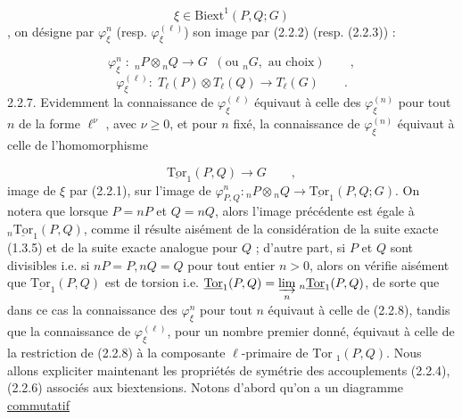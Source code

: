 \begin{equation}\tag{2.2.4}
\xi \in \mathrm{Biext}^1(P,Q;G)
\end{equation}
,
on désigne par $\varphi_\xi^n$ (resp. $\varphi_\xi^{(\ell)}$) son image par (2.2.2) (resp. (2.2.3)) :

\begin{equation}\tag{2.2.5}
\varphi_\xi^n \; : \; {}_nP \otimes {}_nQ \longrightarrow G \;\; (\text{ou } {}_nG, \text{ au choix}) \qquad ,
\end{equation}
\begin{equation}\tag{2.2.6}
\varphi_\xi^{(\ell)} : \; T_\ell(P) \otimes T_\ell(Q) \longrightarrow T_\ell(G) \qquad .
\end{equation}
2.2.7.  Evidemment la connaissance de $\varphi_\xi^{(\ell)}$ équivaut à celle des $\varphi_\xi^{(n)}$ pour tout $n$ de la forme $\ell^\nu$ , avec $\nu \geq 0$, et pour $n$ fixé, la connaissance de $\varphi_\xi^{(n)}$ équivaut à celle de l'homomorphisme

\begin{equation}\tag{2.2.8}
\underline{\mathrm{Tor}}_1(P,Q) \longrightarrow G \qquad ,
\end{equation}
image de $\xi$ par (2.2.1), sur l'image de $\varphi^n_{P,Q} : {}_nP \otimes {}_nQ \longrightarrow \underline{\mathrm{Tor}}_1(P,Q;G)$. On notera que lorsque $P=nP$ et $Q=nQ$, alors l'image précédente est égale à ${}_n\underline{\mathrm{Tor}}_1(P,Q)$, comme il résulte aisément de la considération de la suite exacte (1.3.5) et de la suite exacte analogue pour $Q$ ; d'autre part, si $P$ et $Q$ sont divisibles i.e. si $nP=P,nQ=Q$ pour tout entier $n > 0$, alors on vérifie aisément que $\underline{\mathrm{Tor}}_1(P,Q)$ est de torsion i.e. $\underline{\mathrm{Tor}}_1(P,Q) = \underset{n}{\varinjlim}\; {}_n\underline{\mathrm{Tor}}_1(P,Q)$, de sorte que dans ce cas la connaissance des $\varphi_\xi^n$ pour tout $n$ équivaut à celle de (2.2.8), tandis que la connaissance de $\varphi_\xi^{(\ell)}$, pour un nombre premier donné, équivaut à celle de la restriction de (2.2.8) à la composante $\ell$-primaire de $\mathrm{Tor}\; {}_1(P,Q)$. Nous allons expliciter maintenant les propriétés de symétrie des accouplements (2.2.4), (2.2.6) associés aux biextensions. Notons d'abord qu'on a un diagramme \underline{commutatif}


